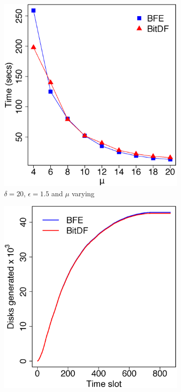\begin{figure}[h!]
    \begin{subfigure}[t]{0.48\textwidth}
        \includegraphics[width=\textwidth]{images/Trucks_l_20_g_1_5_varying_n.eps}
        \caption{$\delta = 20$, $\epsilon = 1.5$ and $\mu$ varying}
        \label{fig:trucks_vary_n}
    \end{subfigure}
    \begin{subfigure}[t]{0.48\textwidth}
        \includegraphics[width=\textwidth]{images/Trucks_d.eps}

\end{subfigure}
\end{figure}
